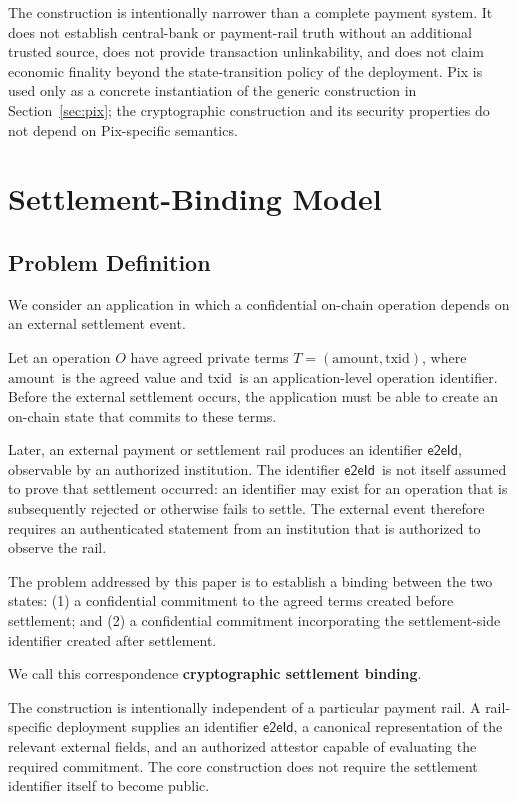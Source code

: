 \documentclass[10pt,twocolumn]{article}
\newcommand{\eeid}{\ensuremath{\mathsf{e2eId}}}
\newcommand{\amount}{\ensuremath{\text{amount}}}
\newcommand{\txid}{\ensuremath{\text{txid}}}
\begin{document}
The construction is intentionally narrower than a complete payment
system. It does not establish central-bank or payment-rail truth without
an additional trusted source, does not provide transaction unlinkability,
and does not claim economic finality beyond the state-transition policy
of the deployment. Pix is used only as a concrete instantiation of the
generic construction in Section~\ref{sec:pix}; the cryptographic
construction and its security properties do not depend on Pix-specific
semantics.

\section{Settlement-Binding Model}
\label{sec:model}

\subsection{Problem Definition}

We consider an application in which a confidential on-chain operation
depends on an external settlement event.

Let an operation $O$ have agreed private terms $T=(\amount,\txid)$, where
\amount\ is the agreed value and \txid\ is an application-level operation
identifier. Before the external settlement occurs, the application must
be able to create an on-chain state that commits to these terms.

Later, an external payment or settlement rail produces an identifier
\eeid, observable by an authorized institution. The identifier \eeid\ is
not itself assumed to prove that settlement occurred: an identifier may
exist for an operation that is subsequently rejected or otherwise fails
to settle. The external event therefore requires an authenticated
statement from an institution that is authorized to observe the rail.

The problem addressed by this paper is to establish a binding between the
two states: (1) a confidential commitment to the agreed terms created
before settlement; and (2) a confidential commitment incorporating the
settlement-side identifier created after settlement.

We call this correspondence \textbf{cryptographic settlement binding}.

The construction is intentionally independent of a particular payment
rail. A rail-specific deployment supplies an identifier \eeid, a
canonical representation of the relevant external fields, and an
authorized attestor capable of evaluating the required commitment. The
core construction does not require the settlement identifier itself to
become public.
\end{document}
